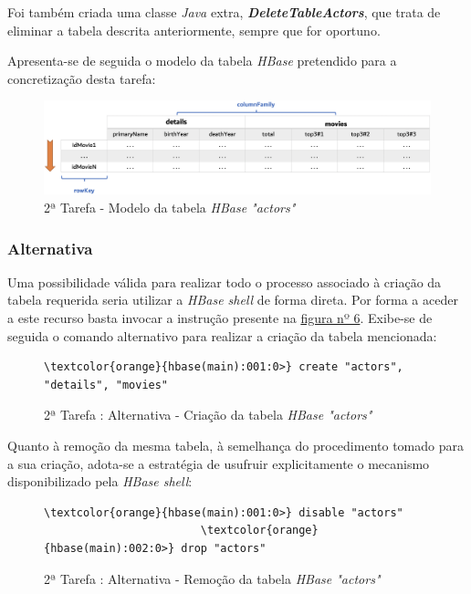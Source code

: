 \documentclass[a4paper]{report}
\begin{document}
{		Foi também criada uma classe \textit{Java} extra, \textbf{\textit{DeleteTableActors}}, que trata de eliminar a tabela descrita anteriormente, sempre que for oportuno.
        
        Apresenta-se de seguida o modelo da tabela \textit{HBase} pretendido para a concretização desta tarefa:
        \begin{figure}[H]
            \centering
            \includegraphics[width=1.0\textwidth]{Images/Task 2 - HBase.png}
            \caption{2ª Tarefa - Modelo da tabela \textit{HBase "actors"}}
            \label{fig:13}
        \end{figure}

			\subsubsection{Alternativa}
			Uma possibilidade válida para realizar todo o processo associado à criação da tabela requerida seria utilizar a \textit{HBase shell} de forma direta. Por forma a aceder a este recurso basta invocar a instrução presente na \hyperref[fig:6]{figura nº 6}.
			Exibe-se de seguida o comando alternativo para realizar a criação da tabela mencionada:

			\begin{figure}[H]
				{
					\color{teal}
					\begin{Verbatim}[commandchars=\\\{\}]
              \textcolor{orange}{hbase(main):001:0>} create "actors", "details", "movies"
					\end{Verbatim}
				}
				\caption{2ª Tarefa : Alternativa - Criação da tabela \textit{HBase "actors"}}
				\label{fig:14}
			\end{figure}
			
			Quanto à remoção da mesma tabela, à semelhança do procedimento tomado para a sua criação, adota-se a estratégia de usufruir explicitamente o mecanismo disponibilizado pela \textit{HBase shell}:
			\begin{figure}[H]
				{
					\color{teal}
					\begin{Verbatim}[commandchars=\\\{\}]
                        \textcolor{orange}{hbase(main):001:0>} disable "actors"
                        \textcolor{orange}{hbase(main):002:0>} drop "actors"
					\end{Verbatim}
				}
				\caption{2ª Tarefa : Alternativa - Remoção da tabela \textit{HBase "actors"}}
				\label{fig:15}
			\end{figure}

}
\end{document}

